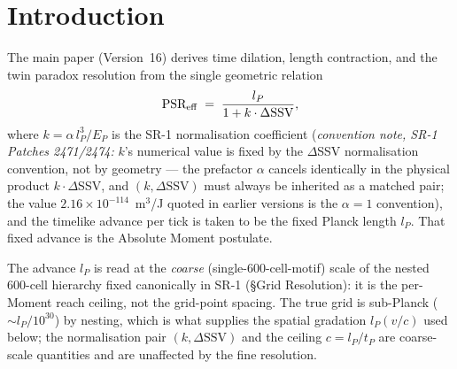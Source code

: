 \documentclass[12pt]{article}
\begin{document}
\begin{abstract}
{exact as the leading-order propagation law and every result in this series is
computed at that order; the band is a refinement on the arrival profile, not a
correction to the speed.  \textbf{This is the definitional statement of PSR
shell propagation for the SR series; the shell language used in the companion
papers inherits this refinement and is not separately qualified.}]}  The PSR (communication radius, set by absolute SSV) and
the displacement step (set by net SSV) are identified as two distinct
quantities, with their coincidence for photons recovering the null-geodesic
condition.  No new postulates beyond those of Version~16 are introduced;
chirality and quantum-tunnelling phenomenology are noted as topics for
dedicated companion papers.
\end{abstract}

\section{Introduction}
\label{sec:intro}

The main paper (Version~16) derives time dilation, length contraction, and the
twin paradox resolution from the single geometric relation
\begin{equation}
  \text{PSR}_{\rm eff} \;=\; \frac{l_P}{1 + k\cdot\Delta\text{SSV}},
  \label{eq:PSR}
\end{equation}
where $k = \alpha\, l_P^3/E_P$ is the SR-1 normalisation coefficient
(\emph{convention note, SR-1 Patches 2471/2474:} $k$'s numerical value is fixed
by the $\Delta$SSV normalisation convention, not by geometry --- the prefactor
$\alpha$ cancels identically in the physical product $k\cdot\Delta$SSV, and
$(k,\Delta\text{SSV})$ must always be inherited as a matched pair; the value
$2.16\times10^{-114}$~m$^3$/J quoted in earlier versions is the $\alpha=1$
convention), and the timelike
advance per tick is taken to be the fixed Planck length $l_P$.  That fixed
advance is the Absolute Moment postulate.

The advance $l_P$ is read at the \emph{coarse} (single-600-cell-motif) scale
of the nested 600-cell hierarchy fixed canonically in SR-1
(\S Grid Resolution): it is the per-Moment reach ceiling, not the grid-point
spacing. The true grid is sub-Planck ($\sim l_P/10^{30}$) by nesting, which
is what supplies the spatial gradation $l_P(v/c)$ used below; the normalisation
pair $(k,\Delta\text{SSV})$ and the ceiling $c=l_P/t_P$ are coarse-scale
quantities and are unaffected by the fine resolution.
\end{document}
